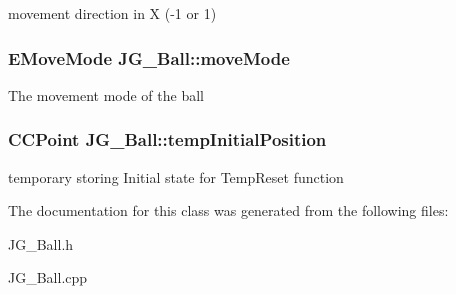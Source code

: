 movement direction in X (-\/1 or 1) \hypertarget{class_j_g___ball_a0ad0f2f4b8d03d63c879544111a24506}{
\subsubsection[{move\-Mode}]{\setlength{\rightskip}{0pt plus 5cm}E\-Move\-Mode J\-G\-\_\-\-Ball\-::move\-Mode}}\label{class_j_g___ball_a0ad0f2f4b8d03d63c879544111a24506}
The movement mode of the ball \hypertarget{class_j_g___ball_a2cab0645b2eb4374fbfde0b0399c0e72}{
\subsubsection[{temp\-Initial\-Position}]{\setlength{\rightskip}{0pt plus 5cm}C\-C\-Point J\-G\-\_\-\-Ball\-::temp\-Initial\-Position}}\label{class_j_g___ball_a2cab0645b2eb4374fbfde0b0399c0e72}
temporary storing Initial state for Temp\-Reset function 

The documentation for this class was generated from the following files\-:\begin{DoxyCompactItemize}
\item 
J\-G\-\_\-\-Ball.\-h\item 
J\-G\-\_\-\-Ball.\-cpp\end{DoxyCompactItemize}
